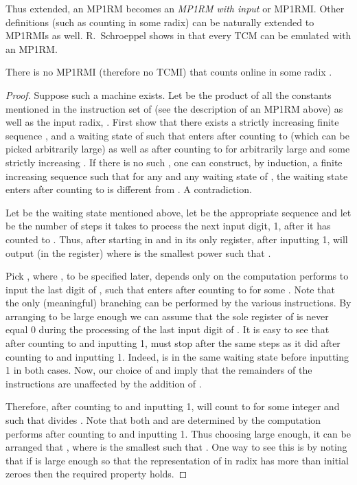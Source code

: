 \documentclass[12pt]{article}
\begin{document}
Thus extended, an MP1RM becomes an
{\it MP1RM with input\/} or MP1RMI. Other definitions (such as counting
in some radix) can be naturally extended to MP1RMIs as
well. R.~Schroeppel shows in \cite{Schroep} that every TCM can be
emulated with an MP1RM.
\begin{theorem}\label{tcexact}
There is no MP1RMI (therefore no TCMI) that counts online in some
radix .
\end{theorem}
\begin{proof}
Suppose such a machine  exists. Let  be the product of all the
constants mentioned in the instruction set of 
(see the description of an MP1RM above) as well as the input radix, . 
First show that there exists a strictly
increasing finite sequence , and a waiting state  of
 such that  enters  after counting to 
(which can be picked arbitrarily large) as
well as after counting to  for arbitrarily
large  and some strictly increasing . If
there is no such , one can construct, by induction, a finite
increasing sequence  such that for any  and any
waiting state  of , the waiting state  enters after counting
to  is different from . A contradiction. 

Let  be the waiting state mentioned above, let  
be the appropriate sequence and let  be the number of steps
it takes  to process the next input digit, 1, after it has counted to
. Thus, after starting in  and
 in its only register, after inputting 1, 
will output (in the register)  where  is
the smallest power such that .

Pick , where , to
be specified later,
depends only on the computation  performs to input the last digit
of , such that 
enters  after counting to 
for some . Note that the only (meaningful) 
branching can be performed by the various  instructions. By
arranging  to be large enough we can assume that the
sole register of  is never equal 0 during the processing of the
last input digit of
. It is easy to see that after counting to
 and inputting 1,  must
stop after the same  steps as it did after counting to
 and inputting 1. Indeed,  is in the same
waiting state  before inputting 1 in both cases. Now, our choice of  and
 imply that the remainders of the 
instructions are unaffected by the addition of .

Therefore, after counting to 
and inputting 1,  will count to
 for some integer
 and  such that  divides . Note that
both  and  are determined by the computation  performs after
counting to  and inputting 1. Thus choosing
 large enough, it can be arranged that
, where  is the
smallest such that . One way to see this is by
noting that if  is large enough so that the representation of
 in radix  has more than  initial zeroes then the
required property holds. 
\end{proof}
\end{document}
